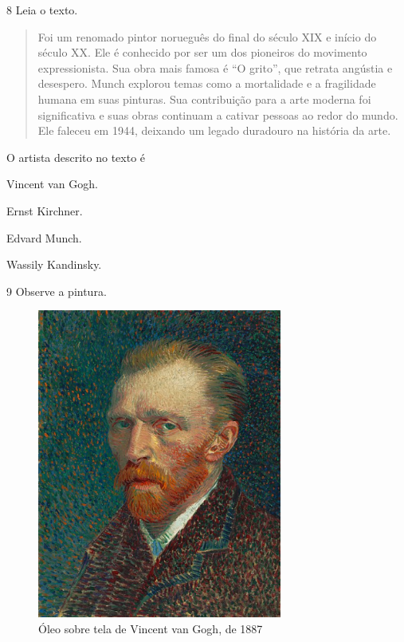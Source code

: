 \num{8} Leia o texto.

\begin{quote}
Foi um renomado pintor norueguês do final do século XIX e início do século XX. 
Ele é conhecido por ser um dos pioneiros do movimento expressionista. Sua obra 
mais famosa é ``O grito'', que retrata angústia e desespero. Munch explorou temas 
como a mortalidade e a fragilidade humana em suas pinturas. Sua contribuição para 
a arte moderna foi significativa e suas obras continuam a cativar pessoas ao redor 
do mundo. Ele faleceu em 1944, deixando um legado duradouro na história da arte.

\end{quote}

\pagebreak
O artista descrito no texto é

\begin{escolha}
\item
  Vincent van Gogh.
\item
  Ernst Kirchner.
\item
  Edvard Munch.
\item
  Wassily Kandinsky.
\end{escolha}




\num{9} Observe a pintura.

\begin{figure}[htpb!]
\includegraphics[width=3.16667in,height=4.01042in]{media/image28.png}
\caption{Óleo sobre tela de Vincent van Gogh, de 1887}
\end{figure}

